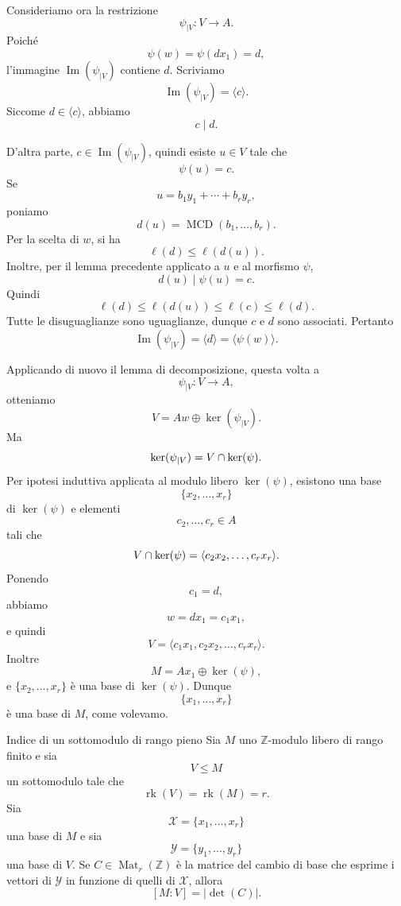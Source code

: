 \documentclass[a4paper]{article}
\begin{document}
\begin{radioactive}
\begin{snippetproof}{}
    Consideriamo ora la restrizione
    \[
        \psi_{|V}\colon V\to A.
    \]
    Poiché
    \[
        \psi(w)=\psi(dx_1)=d,
    \]
    l'immagine \(\operatorname{Im}(\psi_{|V})\) contiene \(d\).
    Scriviamo
    \[
        \operatorname{Im}(\psi_{|V})=\langle c \rangle.
    \]
    Siccome \(d\in\langle c \rangle\), abbiamo
    \[
        c\mid d.
    \]

    D'altra parte, \(c\in\operatorname{Im}(\psi_{|V})\), quindi esiste \(u\in V\) tale che
    \[
        \psi(u)=c.
    \]
    Se
    \[
        u=b_1y_1+\cdots+b_ry_r,
    \]
    poniamo
    \[
        d(u)=\operatorname{MCD}(b_1,\ldots,b_r).
    \]
    Per la scelta di \(w\), si ha
    \[
        \ell(d)\leq \ell(d(u)).
    \]
    Inoltre, per il lemma precedente applicato a \(u\) e al morfismo \(\psi\),
    \[
        d(u)\mid \psi(u)=c.
    \]
    Quindi
    \[
        \ell(d)\leq \ell(d(u))\leq \ell(c)\leq \ell(d).
    \]
    Tutte le disuguaglianze sono uguaglianze, dunque \(c\) e \(d\) sono associati. Pertanto
    \[
        \operatorname{Im}(\psi_{|V})=\langle d \rangle=\langle \psi(w) \rangle.
    \]

    Applicando di nuovo il lemma di decomposizione, questa volta a
    \[
        \psi_{|V}\colon V\to A,
    \]
    otteniamo
    \[
        V=Aw\oplus \ker(\psi_{|V}).
    \]
    Ma
    \[
        \ker(\psi_{|V})=V\cap \ker(\psi).
    \]
    Per ipotesi induttiva applicata al modulo libero \(\ker(\psi)\), esistono una base
    \[
        \{x_2,\ldots,x_r\}
    \]
    di \(\ker(\psi)\) e elementi
    \[
        c_2,\ldots,c_r\in A
    \]
    tali che
    \[
        V\cap \ker(\psi)
        =
        \langle c_2x_2,\ldots,c_rx_r\rangle.
    \]
    Ponendo
    \[
        c_1=d,
    \]
    abbiamo
    \[
        w=dx_1=c_1x_1,
    \]
    e quindi
    \[
        V=\langle c_1x_1,c_2x_2,\ldots,c_rx_r\rangle.
    \]
    Inoltre
    \[
        M=Ax_1\oplus \ker(\psi),
    \]
    e \(\{x_2,\ldots,x_r\}\) è una base di \(\ker(\psi)\). Dunque
    \[
        \{x_1,\ldots,x_r\}
    \]
    è una base di \(M\), come volevamo.
\end{snippetproof}
\end{radioactive}

\begin{radioactive}
\begin{snippetcorollary}{Indice di un sottomodulo di rango pieno}
    Sia \(M\) uno \(\mathbb{Z}\)-modulo libero di rango finito e sia
    \[
        V\leq M
    \]
    un sottomodulo tale che
    \[
        \operatorname{rk}(V)=\operatorname{rk}(M)=r.
    \]
    Sia
    \[
        \mathcal{X}=\{x_1,\ldots,x_r\}
    \]
    una base di \(M\) e sia
    \[
        \mathcal{Y}=\{y_1,\ldots,y_r\}
    \]
    una base di \(V\). Se \(C\in\operatorname{Mat}_r(\mathbb{Z})\) è la matrice del cambio di base che esprime i vettori di \(\mathcal{Y}\) in funzione di quelli di \(\mathcal{X}\), allora
    \[
        [M:V]=|\det(C)|.
    \]
\end{snippetcorollary}
\end{radioactive}
\end{document}
